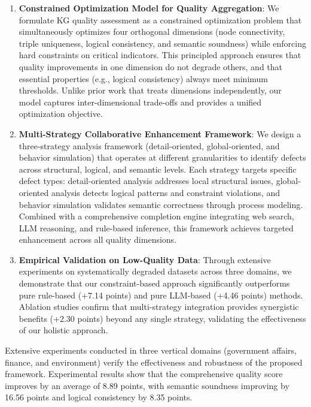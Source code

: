 \documentclass[runningheads]{llncs}
\begin{document}
\begin{enumerate}
    \item \textbf{Constrained Optimization Model for Quality Aggregation}: We formulate KG quality assessment as a constrained optimization problem that simultaneously optimizes four orthogonal dimensions (node connectivity, triple uniqueness, logical consistency, and semantic soundness) while enforcing hard constraints on critical indicators. This principled approach ensures that quality improvements in one dimension do not degrade others, and that essential properties (e.g., logical consistency) always meet minimum thresholds. Unlike prior work that treats dimensions independently, our model captures inter-dimensional trade-offs and provides a unified optimization objective.

    \item \textbf{Multi-Strategy Collaborative Enhancement Framework}: We design a three-strategy analysis framework (detail-oriented, global-oriented, and behavior simulation) that operates at different granularities to identify defects across structural, logical, and semantic levels. Each strategy targets specific defect types: detail-oriented analysis addresses local structural issues, global-oriented analysis detects logical patterns and constraint violations, and behavior simulation validates semantic correctness through process modeling. Combined with a comprehensive completion engine integrating web search, LLM reasoning, and rule-based inference, this framework achieves targeted enhancement across all quality dimensions.

    \item \textbf{Empirical Validation on Low-Quality Data}: Through extensive experiments on systematically degraded datasets across three domains, we demonstrate that our constraint-based approach significantly outperforms pure rule-based (+7.14 points) and pure LLM-based (+4.46 points) methods. Ablation studies confirm that multi-strategy integration provides synergistic benefits (+2.30 points) beyond any single strategy, validating the effectiveness of our holistic approach.
\end{enumerate}

Extensive experiments conducted in three vertical domains (government affairs, finance, and environment) verify the effectiveness and robustness of the proposed framework. Experimental results show that the comprehensive quality score improves by an average of 8.89 points, with semantic soundness improving by 16.56 points and logical consistency by 8.35 points.
\end{document}

